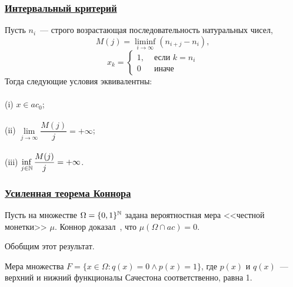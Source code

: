\begin{frame}\frametitle{\underline{Интервальный критерий}}
		\label{thm:M_j_ac0_inf_lim}
		Пусть $n_i$~--- строго возрастающая последовательность натуральных чисел,
		\begin{equation}
			\label{eq:definition_M_j}
			M(j) = \liminf_{i\to\infty} \left(n_{i+j} - n_i\right),
		\end{equation}
		\begin{equation}
			x_k = \left\{\begin{array}{ll}
				1, & \mbox{~если~} k = n_i
				\\
				0  & \mbox{~иначе~}
			\end{array}\right.
		\end{equation}
		Тогда следующие условия эквивалентны:
		\\~\\
		(i)   $x \in ac_0$;
		\\~\\
		(ii)  $\lim\limits_{j \to \infty} \dfrac{M(j)}{j} = +\infty$;
		\\~\\
		(iii) $\inf\limits_{j \in \mathbb{N}}     \dfrac{M(j)}{j} = +\infty$.
\end{frame}



\begin{frame}\frametitle{\underline{Усиленная теорема Коннора}}
	Пусть на множестве $\Omega=\{0,1\}^{\mathbb{N}}$ задана вероятностная мера <<честной монетки>> $\mu$.
	Коннор доказал~\cite{connor1990almost}, что $\mu(\Omega\cap ac)=0$.

	Обобщим этот результат.

	\begin{ttheorem}
	Мера множества $F=\{x\in\Omega : q(x) = 0 \wedge p(x)= 1\}$,
	где $p(x)$ и $q(x)$~--- верхний и нижний функционалы Сачестона соответственно,
	равна 1.
	\end{ttheorem}
\end{frame}


